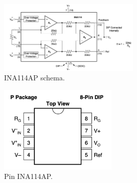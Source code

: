 \documentclass[../main/main.tex]{subfiles}
\begin{document}
\begin{figure}[h!]
\centering
\includegraphics[width=0.6\textwidth]{../lessons/image/03/3.png}
\caption{\label{fig:3_3} INA114AP schema.}
\end{figure}

\begin{figure}[h!]
\centering
\includegraphics[width=0.5\textwidth]{../lessons/image/03/4.png}
\caption{\label{fig:3_4} Pin INA114AP.}
\end{figure}
\end{document}
